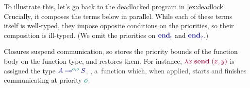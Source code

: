 \documentclass[main.tex]{subfiles}
\begin{document}
To illustrate this, let's go back to the deadlocked program in \cref{ex:deadlock}. Crucially, it composes the terms below in parallel. While each of these terms itself is well-typed, they impose opposite conditions on the priorities, so their composition is ill-typed. (We omit the priorities on $\ty{\tyends}$ and $\ty{\tyendr}$.)
\begin{mathpar}
  \small

\end{mathpar}
Closures suspend communication, so  stores the priority bounds of the function body on the function type, and  restores them. For instance, $\tm{\lambda{x}.\send\;\pair{x}{y}}$ is assigned the type $\ty{\tylolli[\cs{o},\cs{o}]{A}{S}}$, \ie, a~function which, when applied, starts and finishes communicating at priority $\cs{o}$.
\begin{mathpar}
  \small
\end{mathpar}
\end{document}
